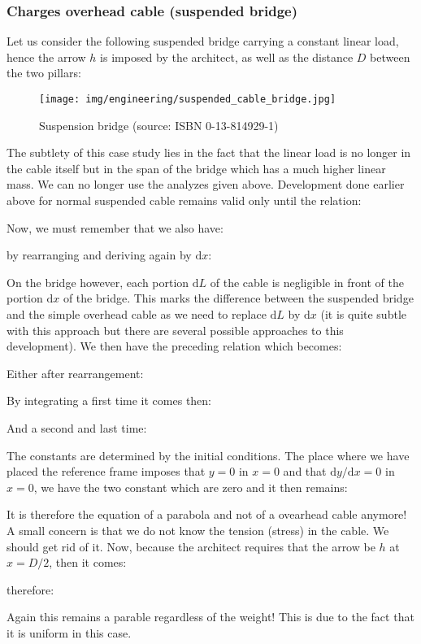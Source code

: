 	\subsubsection{Charges overhead cable (suspended bridge)}
	Let us consider the following suspended bridge carrying a constant linear load, hence the arrow $h$ is imposed by the architect, as well as the distance $D$ between the two pillars:
	\begin{figure}[H]
		\centering
		\texttt{[image: img/engineering/suspended\_cable\_bridge.jpg]}
		\caption{Suspension bridge (source: ISBN 0-13-814929-1)}
	\end{figure}
	The subtlety of this case study lies in the fact that the linear load is no longer in the cable itself but in the span of the bridge which has a much higher linear mass. We can no longer use the analyzes given above. Development done earlier above for normal suspended cable remains valid only until the relation:
	
	Now, we must remember that we also have:
	
	by rearranging and deriving again by $\mathrm{d}x$:
	
	On the bridge however, each portion $\mathrm{d}L$ of the cable is negligible in front of the portion $\mathrm{d}x$ of the bridge. This marks the difference between the suspended bridge and the simple overhead cable as we need to replace $\mathrm{d}L$ by $\mathrm{d}x$ (it is quite subtle with this approach but there are several possible approaches to this development). We then have the preceding relation which becomes:
	
	Either after rearrangement:
	
	By integrating a first time it comes then:
	
	And a second and last time:
	
	The constants are determined by the initial conditions. The place where we have placed the reference frame imposes that $y = 0$ in $x = 0$ and that $\mathrm{d}y / \mathrm{d}x = 0$ in $x = 0$, we have the two constant which are zero and it then remains:
	
	It is therefore the equation of a parabola and not of a ovearhead cable anymore! A small concern is that we do not know the tension (stress) in the cable. We should get rid of it. Now, because the architect requires that the arrow be $h$ at $x = D / 2$, then it comes:
	
	therefore:
	
	Again this remains a parable regardless of the weight! This is due to the fact that it is uniform in this case.

